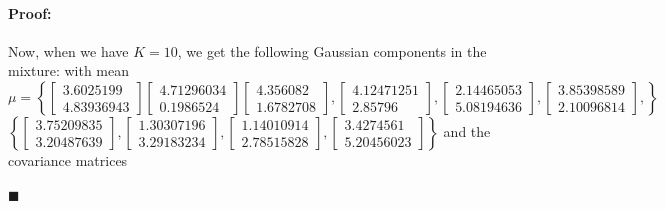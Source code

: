 \documentclass[12pt]{article}
\newenvironment{proof}{\paragraph{Proof: }}{\hfill$\blacksquare$}
\begin{document}
\begin{proof}
\begin{enumerate}
Now, when we have $K = 10$, we get the following Gaussian components in the mixture: with mean $\mu = \left\{ \left[ \begin{matrix} 3.6025199 \\ 4.83936943 \end{matrix} \right] \left[ \begin{matrix} 4.71296034 \\ 0.1986524 \end{matrix}\right] \left[ \begin{matrix} 4.356082 \\ 1.6782708  \end{matrix}\right],\left[ \begin{matrix} 4.12471251 \\ 2.85796  \end{matrix}\right],\left[ \begin{matrix} 2.14465053 \\ 5.08194636 \end{matrix}\right],\left[ \begin{matrix} 3.85398589 \\ 2.10096814 \end{matrix}\right], \right\}$ $\left\{ \left[ \begin{matrix} 3.75209835 \\ 3.20487639 \end{matrix}\right],\left[ \begin{matrix} 1.30307196 \\ 3.29183234 \end{matrix}\right],\left[ \begin{matrix} 1.14010914 \\ 2.78515828 \end{matrix}\right],\left[ \begin{matrix} 3.4274561 \\ 5.20456023 \end{matrix}\right] \right\}$ and the covariance matrices \\

\end{enumerate}
\end{proof}
\end{document}

